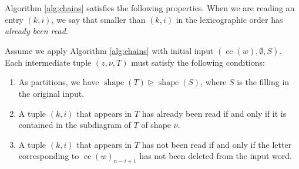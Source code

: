\documentclass[ALCO, Unicode]{cedram}
\DeclareMathOperator{\shape}{shape}
\DeclareMathOperator{\cc}{cc}
\begin{document}
Algorithm \ref{alg:chains} satisfies the following properties.  When we are reading an entry $(k,i)$, we say that smaller than $(k,i)$ in the lexicographic order has \textit{already been read}. 
    \begin{lemma}\label{lemma: props of the alg}
    Assume we apply Algorithm \ref{alg:chains} with initial input $(\cc(w), \emptyset, S)$.
        Each intermediate tuple $(z, \nu, T)$ must  satisfy the following conditions:
    \begin{enumerate}[label=(\alph*)]
        \item As partitions, we have $\shape(T)\unrhd \shape(S)$, where $S$ is the filling in the original input.
        \item A tuple $(k,i)$ that appears in $T$ has already been read if and only if it is contained in the subdiagram of $T$ of shape $\nu$.
        \item A tuple $(k,i)$ that appears in $T$ has not been read if and only if the letter corresponding to $\cc(w)_{n-i+1}$ has not been deleted from the input word. 
    \end{enumerate}
    \end{lemma}
\end{document}
